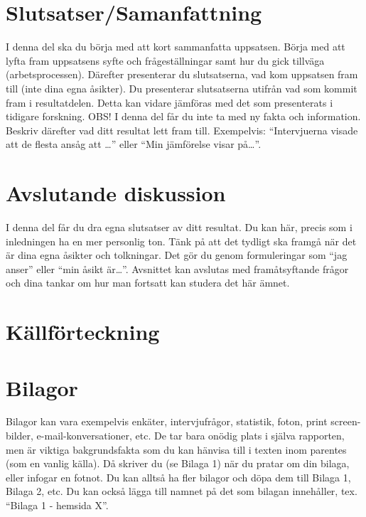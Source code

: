 \documentclass[11pt, a4paper, titlepage]{article}
\begin{document}
\newpage
\section{Slutsatser/Samanfattning}
I denna del ska du börja med att kort sammanfatta uppsatsen. Börja med att lyfta fram uppsatsens syfte och frågeställningar samt hur du gick tillväga (arbetsprocessen). Därefter presenterar du slutsatserna, vad kom uppsatsen fram till (inte dina egna åsikter). Du presenterar slutsatserna utifrån vad som kommit fram i resultatdelen. Detta kan vidare jämföras med det som presenterats i tidigare forskning. OBS! I denna del får du inte ta med ny fakta och information. 
\newline\newline
Beskriv därefter vad ditt resultat lett fram till.
Exempelvis:  “Intervjuerna visade att de flesta ansåg att …” eller “Min jämförelse visar på…”. 

\newpage
\section{Avslutande diskussion}
I denna del får du dra egna slutsatser av ditt resultat. Du kan här, precis som i inledningen ha en mer personlig ton. Tänk på att det tydligt ska framgå när det är dina egna åsikter och tolkningar. Det gör du genom formuleringar som “jag anser” eller “min åsikt är…”. Avsnittet kan avslutas med framåtsyftande frågor och dina tankar om hur man fortsatt kan studera det här ämnet. 


\newpage
\section{Källförteckning}
\newpage
\section{Bilagor}
Bilagor kan vara exempelvis enkäter, intervjufrågor, statistik, foton, print screen-bilder, e-mail-konversationer, etc. De tar bara onödig plats i själva rapporten, men är viktiga bakgrundsfakta som du kan hänvisa till i texten inom parentes (som en vanlig källa). Då skriver du (se Bilaga 1) när du pratar om din bilaga, eller infogar en fotnot. Du kan alltså ha fler bilagor och döpa dem till Bilaga 1, Bilaga 2, etc. Du kan också lägga till namnet på det som bilagan innehåller, tex. “Bilaga 1 - hemsida X”. 

	
\end{document}
